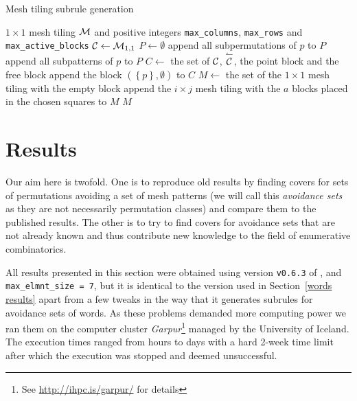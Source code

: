 \begin{algorithm}[ht]
  \caption{Mesh tiling subrule generation}
  \begin{algorithmic}
  \REQUIRE $1 \times 1$ mesh tiling ${\mathcal{M}}$ and positive integers \texttt{max\_columns}, \texttt{max\_rows} and \texttt{max\_active\_blocks}
  \STATE ${\mathcal{C}} \leftarrow {\mathcal{M}}_{1, 1}$
  \STATE $P \leftarrow \emptyset$
      \STATE append all subpermutations of $p$ to $P$
      \STATE append all subpatterns of $p$ to $P$
    \ENDIF
  \ENDFOR
  \STATE $C \leftarrow$ the set of ${\mathcal{C}}$, $\overset{\leftharpoonup}{{\mathcal{C}}}$, the point block and the free block
    \STATE append the block $\left( \left\{ p \right\}, \emptyset \right)$ to $C$
  \ENDFOR
  \STATE $M \leftarrow$ the set of the $1 \times 1$ mesh tiling with the empty block
        \STATE append the $i \times j$ mesh tiling with the $a$ blocks placed in the chosen squares to $M$
      \ENDFOR
    \ENDFOR
  \ENDFOR
  \ENDFOR
  \ENDFOR
  \RETURN $M$
  \end{algorithmic}
  \label{algorithm:mesh tiling subrule generation}
\end{algorithm}



\section{Results\label{mesh tilings results}}

Our aim here is twofold. One is to reproduce old results by finding covers for 
sets of permutations avoiding a set of mesh patterns (we will call this 
\emph{avoidance sets} as they are not necessarily permutation classes) and 
compare them to the published results. The other is to try to find covers for 
avoidance sets that are not already known and thus contribute new knowledge to 
the field of enumerative combinatorics.

All results presented in this section were obtained using version \texttt{v0.6.3}
of \CombCov, and \texttt{max\_elmnt\_size = 7}, but it is identical to the version
used in Section~\ref{words results} apart from a few tweaks in the way that it 
generates subrules for avoidance sets of words.
As these problems demanded more computing power we ran them on the computer 
cluster \emph{Garpur}\footnote{See \url{http://ihpc.is/garpur/} for details} 
managed by the University of Iceland. The execution times ranged from 
hours to days with a hard 2-week time limit after which the execution was 
stopped and deemed unsuccessful.

